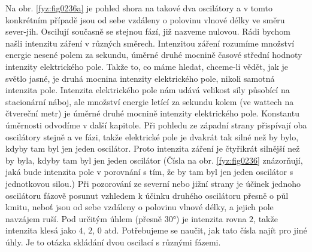     Na obr. \ref{fyz:fig0236a} je pohled shora na takové dva oscilátory a v tomto konkrétním případě 
    jsou od sebe vzdáleny o polovinu vlnové délky ve směru sever-jih. Oscilují současně se stejnou 
    fází, již nazveme nulovou. Rádi bychom našli intenzitu záření v různých směrech. Intenzitou 
    záření rozumíme množství energie nesené polem za sekundu, úměrné druhé mocnině časové střední 
    hodnoty intenzity elektrického pole. Takže to, co máme hledat, chceme-li vědět, jak je světlo 
    jasné, je druhá mocnina intenzity elektrického pole, nikoli samotná intenzita pole. Intenzita 
    elektrického pole nám udává velikost síly působící na stacionární náboj, ale množství energie 
    letící za sekundu kolem (ve wattech na čtvereční metr) je úměrné druhé mocnině intenzity 
    elektrického pole. Konstantu úměrnosti odvodíme v další kapitole. Při pohledu ze západní strany 
    přispívají oba oscilátory stejně a ve fázi, takže elektrické pole je dvakrát tak silné než by 
    bylo, kdyby tam byl jen jeden oscilátor. Proto intenzita záření je čtyřikrát silnější než by 
    byla, kdyby tam byl jen jeden oscilátor (Čísla na obr. \ref{fyz:fig0236} znázorňují, jaká bude 
    intenzita pole v porovnání s tím, že by tam byl jen jeden oscilátor s jednotkovou silou.) Při 
    pozorování ze severní nebo jižní strany je účinek jednoho oscilátoru fázově posunut vzhledem k 
    účinku druhého oscilátoru přesně o půl kmitu, neboť jsou od sebe vzdáleny o polovinu vlnové 
    délky, a jejich pole navzájem ruší. Pod určitým úhlem (přesně \ang{30}) je intenzita rovna 
    \(2\), takže intenzita klesá jako \(4\), \(2\), \(0\) atd. Potřebujeme se naučit, jak tato 
    čísla najít pro jiné úhly. Je to otázka skládání dvou oscilací s různými fázemi.
    
